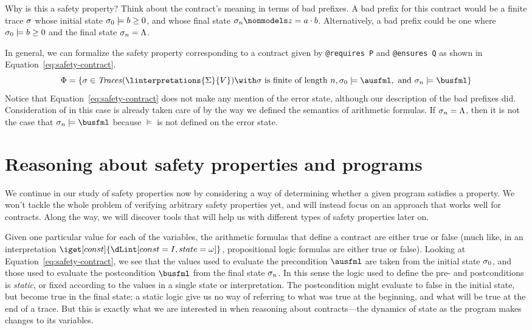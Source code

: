 \documentclass[11pt,twoside]{scrartcl}
\begin{document}
Why is this a safety property? Think about the contract's meaning in terms of bad prefixes. A bad prefix for this contract would be a finite trace $\sigma$ whose initial state $\sigma_0 \models b \ge 0$, and whose final state $\atrace_n \nonmodels z = a \cdot b$. Alternatively, a bad prefix could be one where $\sigma_0 \models b \ge 0$ and the final state $\sigma_n = \Lambda$.

In general, we can formalize the safety property corresponding to a contract given by \verb'@requires P' and \verb'@ensures Q' as shown in Equation~\ref{eq:safety-contract}.
\begin{equation}
\label{eq:safety-contract}
\Phi = \{\atrace \in \ttraces{\linterpretations{\Sigma}{V}} \with \atrace~\text{is finite of length}~n, \atrace_0 \models \ausfml,~\text{and}~\atrace_n \models \busfml\}
\end{equation}
Notice that Equation~\ref{eq:safety-contract} does not make any mention of the error state, although our description of the bad prefixes did. Consideration of \errstate in this case is already taken care of by the way we defined the semantics of arithmetic formulas. If $\sigma_n = \Lambda$, then it is not the case that $\atrace_n \models \busfml$ because $\models$ is not defined on the error state.

\section{Reasoning about safety properties and programs}

We continue in our study of safety properties now by considering a way of determining whether a given program satisfies a property. We won't tackle the whole problem of verifying arbitrary safety properties yet, and will instead focus on an approach that works well for contracts. Along the way, we will discover tools that will help us with different types of safety properties later on.

Given one particular value for each of the variables, the arithmetic formulas that define a contract are either true or false (much like, in an interpretation $\iget[const]{\I}$, propositional logic formulas are either true or false). Looking at Equation~\ref{eq:safety-contract}, we see that the values used to evaluate the precondition $\ausfml$ are taken from the initial state $\sigma_0$, and those used to evaluate the postcondition $\busfml$ from the final state $\sigma_n$. In this sense the logic used to define the pre- and postconditions is \emph{static}, or fixed according to the values in a single state or interpretation. The postcondition might evaluate to false in the initial state, but become true in the final state; a static logic give us no way of referring to what was true at the beginning, and what will be true at the end of a trace. But this is exactly what we are interested in when reasoning about contracts---the dynamics of state as the program makes changes to its variables.
\end{document}
